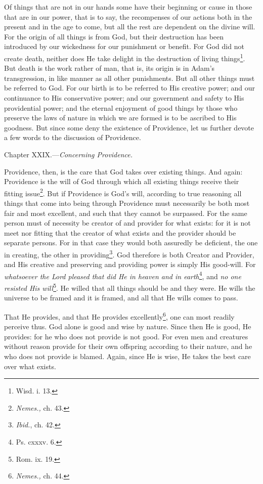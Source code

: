 Of things that are not in our hands some have their beginning or cause in those that are in our power, that is to say, the recompenses of our actions both in the present and in the age to come, but all the rest are dependent on the divine will. For the origin of all things is from God, but their destruction has been introduced by our wickedness for our punishment or benefit. For God did not create death, neither does He take delight in the destruction of living things\footnote{Wisd. i. 13.}. But death is the work rather of man, that is, its origin is in Adam’s transgression, in like manner as all other punishments. But all other things must be referred to God. For our birth is to be referred to His creative power; and our continuance to His conservative power; and our government and safety to His providential power; and the eternal enjoyment of good things by those who preserve the laws of nature in which we are formed is to be ascribed to His goodness. But since some deny the existence of Providence, let us further devote a few words to the discussion of Providence.


Chapter XXIX.—\emph{Concerning Providence.}

Providence, then, is the care that God takes over existing things. And again: Providence is the will of God through which all existing things receive their fitting issue\footnote{\emph{Nemes.,} ch. 43.}. But if Providence is God’s will, according to true reasoning all things that come into being through Providence must necessarily be both most fair and most excellent, and such that they cannot be surpassed. For the same person must of necessity be creator of and provider for what exists: for it is not meet nor fitting that the creator of what exists and the provider should be separate persons. For in that case they would both assuredly be deficient, the one in creating, the other in providing\footnote{\emph{Ibid.}, ch. 42.}. God therefore is both Creator and Provider, and His creative and preserving and providing power is simply His good-will. For \emph{whatsoever the Lord pleased that did He in heaven and in earth}\footnote{Ps. cxxxv. 6.}, and \emph{no one resisted His will}\footnote{Rom. ix. 19.}. He willed that all things should be and they were. He wills the universe to be framed and it is framed, and all that He wills comes to pass.

That He provides, and that He provides excellently\footnote{\emph{Nemes., }ch. 44.}, one can most readily perceive thus. God alone is good and wise by nature. Since then He is good, He provides: for he who does not provide is not good. For even men and creatures without reason provide for their own offspring according to their nature, and he who does not provide is blamed. Again, since He is wise, He takes the best care over what exists.

